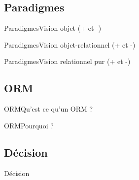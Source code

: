 \subsection{Paradigmes}
\begin{frame}{Paradigmes}{Vision objet}
(+ et -)
\end{frame}

\begin{frame}{Paradigmes}{Vision objet-relationnel}
(+ et -)
\end{frame}

\begin{frame}{Paradigmes}{Vision relationnel pur}
(+ et -)
\end{frame}

\subsection{ORM}
\begin{frame}{ORM}{Qu'est ce qu'un ORM ?}
\end{frame}

\begin{frame}{ORM}{Pourquoi ?}
\end{frame}

\subsection{Décision}
\begin{frame}{Décision}
\end{frame}